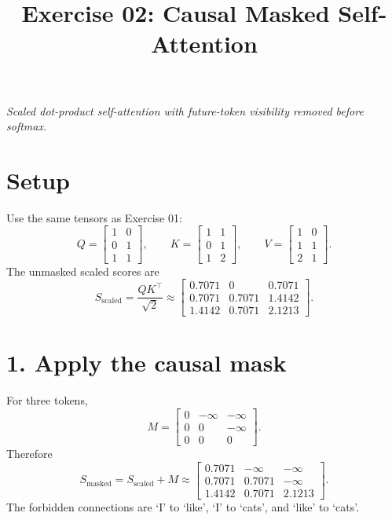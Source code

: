 \documentclass[11pt]{article}
\title{\textbf{Exercise 02: Causal Masked Self-Attention}}
\author{}
\date{}
\begin{document}
\maketitle

\begin{center}
\emph{Scaled dot-product self-attention with future-token visibility removed before softmax.}
\end{center}

\section*{Setup}

Use the same tensors as Exercise 01:
\[
Q=
\begin{bmatrix}
1&0\\
0&1\\
1&1
\end{bmatrix},
\qquad
K=
\begin{bmatrix}
1&1\\
0&1\\
1&2
\end{bmatrix},
\qquad
V=
\begin{bmatrix}
1&0\\
1&1\\
2&1
\end{bmatrix}.
\]
The unmasked scaled scores are
\[
S_{\mathrm{scaled}}
=\frac{QK^\top}{\sqrt{2}}
\approx
\begin{bmatrix}
0.7071&0&0.7071\\
0.7071&0.7071&1.4142\\
1.4142&0.7071&2.1213
\end{bmatrix}.
\]

\section*{1. Apply the causal mask}

For three tokens,
\[
M=
\begin{bmatrix}
0&-\infty&-\infty\\
0&0&-\infty\\
0&0&0
\end{bmatrix}.
\]
Therefore
\[
S_{\mathrm{masked}}
=S_{\mathrm{scaled}}+M
\approx
\begin{bmatrix}
0.7071&-\infty&-\infty\\
0.7071&0.7071&-\infty\\
1.4142&0.7071&2.1213
\end{bmatrix}.
\]
The forbidden connections are `I' to `like', `I' to `cats', and `like' to `cats'.
\end{document}
